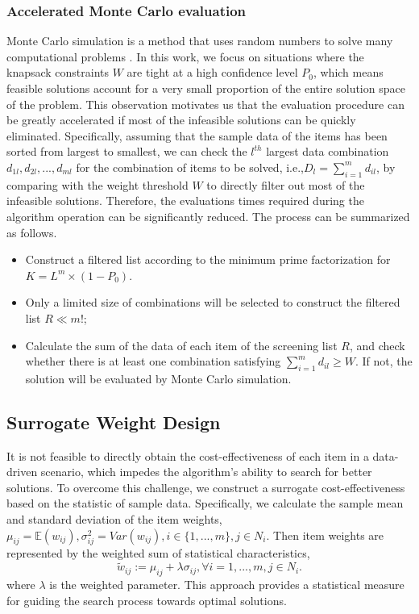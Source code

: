 \documentclass[lettersize,journal]{IEEEtran}
\begin{document}
\subsubsection{Accelerated Monte Carlo evaluation}
Monte Carlo simulation is a method that uses random numbers to solve many computational problems \cite{metropolis1949monte}. 
In this work, we focus on situations where the knapsack constraints $W$ are tight at a high confidence level $P_0$, which means feasible solutions account for a very small proportion of the entire solution space of the problem. 
This observation motivates us that the evaluation procedure can be greatly accelerated if most of the infeasible solutions can be quickly eliminated. 
Specifically, assuming that the sample data of the items has been sorted from largest to smallest, we can check the $l^{th}$ largest data combination $d_{1l}, d_{2l},...,d_{ml}$ for the combination of items to be solved, i.e.,$D_l = \sum_{i=1}^{m}d_{il}$, by comparing with the weight threshold $W$ to directly filter out most of the infeasible solutions. 
Therefore, the evaluations times required during the algorithm operation can be significantly reduced. 
The process can be summarized as follows.
\begin{itemize}
    \item Construct a filtered list according to the minimum prime factorization for $K=L^m\times (1-P_0 )$.
    \item Only a limited size of combinations will be selected to construct the filtered list $R\ll m!$;
    \item Calculate the sum of the data of each item of the screening list $R$, and check whether there is at least one combination satisfying $\sum_{i=1}^{m}d_{il} \geq W$. If not, the solution will be evaluated by Monte Carlo simulation.
\end{itemize}

\subsection{Surrogate Weight Design}
It is not feasible to directly obtain the cost-effectiveness of each item in a data-driven scenario, which impedes the algorithm’s ability to search for better solutions. 
To overcome this challenge, we construct a surrogate cost-effectiveness based on the statistic of sample data. 
Specifically, we calculate the sample mean and standard deviation of the item weights, $\mu_{ij}=\mathbb{E}(w_{ij}),\sigma^2_{ij}=Var(w_{ij}),i\in \{1,...,m\}, j \in N_i$. 
Then item weights are represented by the weighted sum of statistical characteristics,
\begin{equation}\label{Definition: surrogate weights}
    \tilde{w}_{ij}:=\mu_{ij}+\lambda\sigma _{ij}, \forall{i}=1,...,m, j\in N_i.
\end{equation}
where $\lambda $ is the weighted parameter. 
This approach provides a statistical measure for guiding the search process towards optimal solutions.
\end{document}
